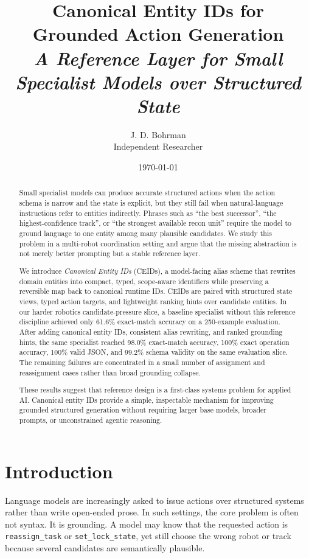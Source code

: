 \documentclass[11pt]{article}
\title{%
  \vspace{-1.2em}%
  {\LARGE\bfseries Canonical Entity IDs for\\[0.35em]
  Grounded Action Generation}\\[0.9em]
  {\large\itshape A Reference Layer for Small Specialist Models over Structured State}%
}
\author{J. D. Bohrman\\[0.35em]\normalsize Independent Researcher}
\date{\today}
\begin{document}
\maketitle

\begin{abstract}
Small specialist models can produce accurate structured actions when the action schema is narrow and the state is explicit, but they still fail when natural-language instructions refer to entities indirectly. Phrases such as \enquote{the best successor}, \enquote{the highest-confidence track}, or \enquote{the strongest available recon unit} require the model to ground language to one entity among many plausible candidates. We study this problem in a multi-robot coordination setting and argue that the missing abstraction is not merely better prompting but a stable reference layer.

We introduce \emph{Canonical Entity IDs} (CEIDs), a model-facing alias scheme that rewrites domain entities into compact, typed, scope-aware identifiers while preserving a reversible map back to canonical runtime IDs. CEIDs are paired with structured state views, typed action targets, and lightweight ranking hints over candidate entities. In our harder robotics candidate-pressure slice, a baseline specialist without this reference discipline achieved only 61.6\% exact-match accuracy on a 250-example evaluation. After adding canonical entity IDs, consistent alias rewriting, and ranked grounding hints, the same specialist reached 98.0\% exact-match accuracy, 100\% exact operation accuracy, 100\% valid JSON, and 99.2\% schema validity on the same evaluation slice. The remaining failures are concentrated in a small number of assignment and reassignment cases rather than broad grounding collapse.

These results suggest that reference design is a first-class systems problem for applied AI. Canonical entity IDs provide a simple, inspectable mechanism for improving grounded structured generation without requiring larger base models, broader prompts, or unconstrained agentic reasoning.
\end{abstract}

\section{Introduction}
Language models are increasingly asked to issue actions over structured systems rather than write open-ended prose. In such settings, the core problem is often not syntax. It is grounding. A model may know that the requested action is \texttt{reassign\_task} or \texttt{set\_lock\_state}, yet still choose the wrong robot or track because several candidates are semantically plausible.
\end{document}
